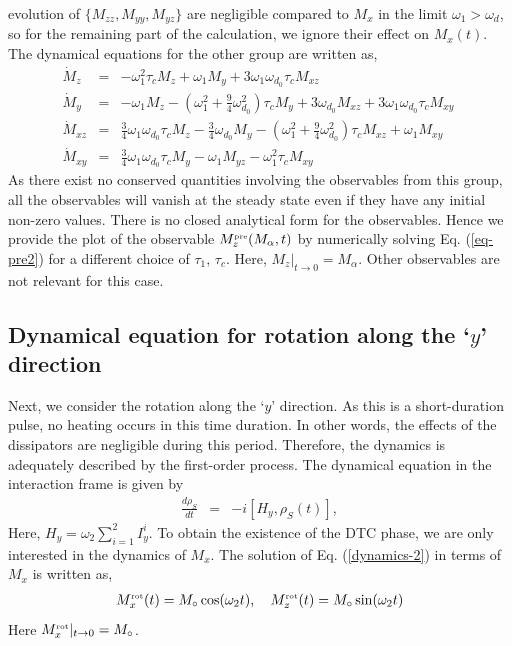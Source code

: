 \documentclass[pra,aps,preprint,floatfix]{revtex4-1}
\newcommand{\rh}{\rho_{\scriptscriptstyle  S}}
\newcommand{\stoo}{\vert_{t\rightarrow 0}}
\begin{document}
evolution of $\{M_{zz}, M_{yy}, M_{yz}\}$ are negligible compared to $M_x$ in the limit $\omega_1 > \omega_d$, so for 
the remaining part of the calculation, we ignore their effect on $M_x(t)$. The dynamical equations for the other group 
are written as,
\begin{eqnarray}\label{eq-pre2} 
\dot{M}_{z} &=& - \omega_{1}^2 \tau_c  M_{z} + \omega_1 M_y + 3 \omega_1 \omega_{d_0} \tau_c M_{xz}  \\
\dot{M}_{y} &=& -\omega_1 M_z -(\omega_1^2 + \frac{9}{4}\omega_{d_0}^2 ) \tau_cM_{y} +3 \omega_{d_0} M_{xz} +  3 \omega_1 \omega_{d_0} \tau_c M_{xy}\  \\
\dot{M}_{xz} &=& \frac{3}{4} \omega_1 \omega_{d_0} \tau_c M_{z} -\frac{3}{4} \omega_{d_0} M_{y}-(\omega_1^2 + \frac{9}{4}\omega_{d_0}^2 ) \tau_c M_{xz} + \omega_1 M_{xy}\\
\dot{M}_{xy} &=& \frac{3}{4} \omega_1 \omega_{d_0} \tau_c M_{y} -\omega_1M_{yz} -\omega_1^2 \tau_c M_{xy}
\end{eqnarray}
As there exist no conserved quantities involving the observables from this group, all the observables will vanish at 
the steady state even if they have any initial non-zero values. There is no closed analytical
form for the observables. Hence we provide the plot of the observable $M_z^{\scriptscriptstyle \rm pre}
(M_\alpha, t)$ by numerically solving Eq. (\ref{eq-pre2})  for a different choice of $\tau_1, \, \tau_c$.
Here, $M_z\stoo = M_\alpha$. Other observables are not relevant for this case.
\subsection{Dynamical equation for rotation along the `$y$' direction}\label{sub2}
Next, we consider the rotation along the `$y$' direction. As this is a short-duration pulse, no heating occurs in this 
time duration. In other words, the effects of the dissipators are negligible during this period. Therefore, the dynamics 
is adequately described by the first-order process. The dynamical equation in the interaction frame is given by
\begin{eqnarray}\label{dynamics-2}
\frac{d\rh}{dt}&=& -i\left[H_y, \rh(t)\right],
\end{eqnarray}
Here, $H_y = \omega_2 \sum_{i=1}^2 I_y^i$. 
To obtain the existence of the DTC phase, we are only interested in the dynamics of $M_x$. The solution of Eq. (\ref{dynamics-2}) in terms of $M_x$ is written as,
\begin{eqnarray}
M_x^{\scriptscriptstyle \rm rot} (t) = M_\circ \cos(\omega_2 t),\quad M_z^{\scriptscriptstyle \rm rot} (t) = M_\circ \sin(\omega_2 t) 
\end{eqnarray}
Here $M_x^{\scriptscriptstyle \rm rot} \stoo = M_\circ$. 
\end{document}
